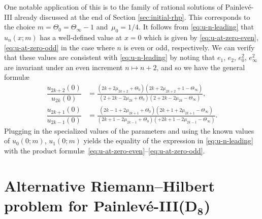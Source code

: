 \documentclass[pdftex]{sigma}
\numberwithin{equation}{section}
\begin{document}
One notable application of this is to the family of rational solutions of Painlev\'e-III already discussed at the end of Section \ref{sec:initial-rhp}. This corresponds to the choice $m = \Theta_0 = \Theta_\infty - 1$ and~${\mu_0 = 1/4}$. It follows from \eqref{eq:u-n-leading} that $u_n(x;m)$ has a well-defined value at $x = 0$ which is given by \eqref{eq:u-at-zero-even}, \eqref{eq:u-at-zero-odd} in the case where $n$ is even or odd, respectively. We can verify that these values are consistent with \eqref{eq:u-n-leading} by noting that $e_1$, $e_2$, $e_0^2$, $e_\infty^2$ are invariant under an even increment $n \mapsto n+2$, and so we have the general formul\ae
\begin{align*}
\dfrac{u_{2k+2}(0)}{u_{2k}(0)} &= \frac{(2 k + 2\mu_{2k+2} + \Theta_0 ) (2 k+2\mu_{2k+2} +1-\Theta_\infty )}{(2 +2 k-2 \mu_{2k} +\Theta_0) (2+2 k-2 \mu_{2k} -\Theta_\infty )}, \\
\dfrac{u_{2k+1}(0)}{u_{2k-1}(0)} &= \frac{(2 k - 1+2 \mu_{2k+1} +\Theta_0) (2 k + 1+2 \mu_{2k+1} -\Theta_\infty )}{(2 k + 1-2 \mu_{2k-1} +\Theta_0) (+2 k + 1-2 \mu_{2k-1} -\Theta_\infty )}.
\end{align*}
Plugging in the specialized values of the parameters and using the known values of $u_0(0;m)$, $u_1(0;m)$ yields the equality of the expression in \eqref{eq:u-n-leading} with the product formul\ae\ \eqref{eq:u-at-zero-even}--\eqref{eq:u-at-zero-odd}.

\section[Alternative Riemann-Hilbert problem for Painlev\'e-III(D\_8)]{Alternative Riemann--Hilbert problem for Painlev\'e-III($\boldsymbol{D_8}$)}
\end{document}
